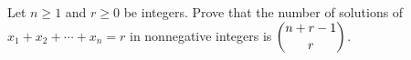 Let $n\ge1$ and $r\ge0$ be integers. Prove that the number of solutions of $x_1+x_2+\cdots+x_n=r$ in nonnegative integers is $\dbinom{n+r-1}{r}$.
